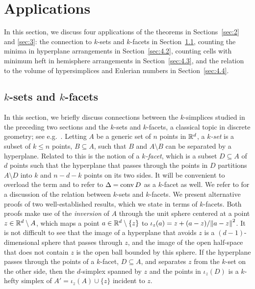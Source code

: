\documentclass[10pt,a4paper]{article}
\newcommand {\mm}[1] {\ifmmode{#1}\else{\mbox{\(#1\)}}\fi}
\theoremstyle{plain}
\newcommand{\Rspace}        {\mm{{\mathbb R}}}
\newcommand{\conv}[1]       {\mm{{\rm conv\,}{#1}}}
\newcommand{\Edist}[2]      {\mm{\|{#1}-{#2}\|}}
\begin{document}
\section{Applications}
\label{sec:4}
In this section, we discuss four applications of the theorems in Sections~\ref{sec:2} and \ref{sec:3}:
the connection to $k$-sets and $k$-facets in Section~\ref{sec:4.1}, counting the minima in hyperplane arrangements in Section~\ref{sec:4.2}, counting cells with minimum heft in hemisphere arrangements in Section~\ref{sec:4.3}, and the relation to the volume of hypersimplices and Eulerian numbers in Section~\ref{sec:4.4}.
\subsection{$k$-sets and $k$-facets}
\label{sec:4.1}
In this section, we briefly discuss connections between the $k$-simplices studied in the preceding two sections and the $k$-sets and $k$-facets, a classical topic in discrete geometry; see e.g.\ \cite[Chapter~11]{Mat02}.
Letting $A$ be a generic set of $n$ points in $\Rspace^d$, a \emph{$k$-set} is a subset of $k \leq n$ points, $B \subseteq A$, such that $B$ and $A \setminus B$ can be separated by a hyperplane.
Related to this is the notion of a \emph{$k$-facet}, which is a subset $D \subseteq A$ of $d$ points such that the hyperplane that passes through the points in $D$ partitions $A \setminus D$ into $k$ and $n-d-k$ points on its two sides.
It will be convenient to overload the term and to refer to $\Delta = \conv{D}$ as a $k$-facet as well.
We refer to \cite[Section~2.2]{Wag08} for a discussion of the relation between $k$-sets and $k$-facets.
\smallskip
We present alternative proofs of two well-established results, which we state in terms of $k$-facets.
Both proofs make use of the \emph{inversion} of $A$ through the unit sphere centered at a point $z \in \Rspace^d \setminus A$, which maps a point $a \in \Rspace^d \setminus \{z\}$ to $\iota_z (a) = z + (a-z)/\Edist{a}{z}^2$.
It is not difficult to see that the image of a hyperplane that avoids $z$ is a $(d-1)$-dimensional sphere that passes through $z$, and the image of the open half-space that does not contain $z$ is the open ball bounded by this sphere.
If the hyperplane passes through the points of a $k$-facet, $D \subseteq A$, and separates $z$ from the $k$-set on the other side, then the $d$-simplex spanned by $z$ and the points in $\iota_z (D)$ is a $k$-hefty simplex of $A' = \iota_z (A) \cup \{z\}$ incident to $z$.
\end{document}
